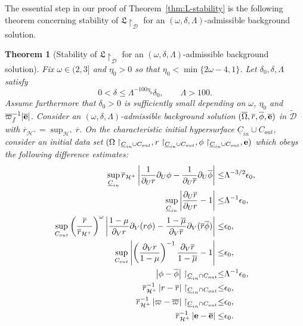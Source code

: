 \documentclass[10pt, reqno]{amsart}
\newtheorem{theorem}{Theorem}[section]
\theoremstyle{definition}
\theoremstyle{remark}
\theoremstyle{conjecture}
\numberwithin{equation}{section}
\newcommand{\abs}[1]{\vert#1\vert}
\newcommand{\set}[1]{\{#1\}}
\newcommand{\rd}{\partial}
\newcommand{\0}{\emptyset}
\newcommand{\dlt}{\delta}
\newcommand{\eps}{\epsilon}
\newcommand{\Lmb}{\Lambda}
\newcommand{\omg}{\omega}
\newcommand{\Omg}{\Omega}
\newcommand{\bfe}{{\bf e}}
\newcommand{\calD}{\mathcal D}
\newcommand{\calH}{\mathcal H}
\newcommand{\uC}{\underline{C}}
\newcommand{\EH}{\calH^{+}}
\newcommand{\e}{\bfe}							%
\newcommand{\Omgbg}{\overline{\Omg}}				%
\newcommand{\phibg}{\overline{\phi}}				%
\newcommand{\rbg}{\overline{r}}					%
\newcommand{\varpibg}{\overline{\varpi}}				%
\newcommand{\mubg}{\overline{\mu}}				%
\newcommand{\ebg}{\overline{\e}}					%
\newcommand{\Abs}[1]{\left\vert #1 \right\vert}
\begin{document}
The essential step in our proof of Theorem~\ref{thm:L-stability} is the following theorem concerning stability of $\mathfrak{L} \restriction_{\calD}$ for an $(\omg, \dlt, \Lmb)$-admissible background solution. 
\begin{theorem} [Stability of $\mathfrak{L} \restriction_{\calD}$ for an $(\omg, \dlt, \Lmb)$-admissible background solution] \label{thm:L-st-ch}
Fix $\omg \in (2, 3]$ and $\eta_{0} > 0$ so that $\eta_{0} < \min \set{2 \omg - 4, 1}$. Let $\dlt_{0}, \dlt, \Lmb$ satisfy
\begin{equation} \label{eq:L-st-ch:dlt}
	0 < \dlt \leq \Lmb^{-100 \eta_{0}} \dlt_{0}, \qquad \Lmb > 100.
\end{equation}
Assume furthermore that $\dlt_{0} > 0$ is sufficiently small depending on $\omg$, $\eta_{0}$ and $\varpibg_{f}^{-1} \abs{\ebg}$. Consider an $(\omg, \dlt, \Lmb)$-admissible background solution $(\Omgbg, \rbg, \phibg, \ebg)$ in $\widetilde{\calD}$ with $\rbg_{\EH} = \sup_{\EH} \rbg$.
On the characteristic initial hypersurface $\uC_{in} \cup C_{out}$, consider an initial data set $(\Omg \restriction_{\uC_{in} \cup C_{out}}, r \restriction_{\uC_{in} \cup C_{out}}, \phi \restriction_{\uC_{in} \cup C_{out}}, \e)$ which obeys the following difference estimates:
\begin{align} 
\sup_{\uC_{in}} \rbg_{\EH} \Abs{\frac{1}{\rd_{U} r} \rd_{U} \phi - \frac{1}{\rd_{U} \rbg} \rd_{U} \phibg} \leq & \Lmb^{-3/2} \eps_{0}, \label{eq:L-st-ch:ini-duphi} \\
\sup_{\uC_{in}}\Abs{\frac{\rd_{U} \rbg}{\rd_{U} r} - 1} \leq & \Lmb^{-1} \eps_{0}, \label{eq:L-st-ch:ini-dur} \\
\sup_{C_{out}} \left(\frac{\rbg}{\rbg_{\EH}}\right)^{\omg} \Abs{\frac{1-\mu}{\rd_{V} r} \rd_{V} (r \phi) - \frac{1-\mubg}{\rd_{V} \rbg} \rd_{V} (\rbg \phibg)} \leq & \eps_{0}, \label{eq:L-st-ch:ini-dvrphi} \\
\sup_{C_{out}} \Abs{\left( \frac{\rd_{V} r}{1-\mu}\right)^{-1}\frac{\rd_{V} \rbg}{1-\mubg} - 1} \leq & \eps_{0}, \label{eq:L-st-ch:ini-dvr} \\
\Abs{\phi - \phibg} \restriction_{\uC_{in} \cap C_{out}} \leq & \Lmb^{-1} \eps_{0}, \label{eq:L-st-ch:ini-phi}\\
\rbg_{\EH}^{-1} \Abs{r - \rbg} \restriction_{\uC_{in} \cap C_{out}} \leq & \eps_{0}, \label{eq:L-st-ch:ini-r} \\
\rbg_{\EH}^{-1} \Abs{\varpi - \varpibg} \restriction_{\uC_{in} \cap C_{out}} \leq & \eps_{0}, \label{eq:L-st-ch:ini-m}\\
\rbg_{\EH}^{-1} \Abs{\e - \ebg} \leq & \eps_{0}. \label{eq:L-st-ch:ini-e}

\end{align}
\end{theorem}
\end{document}
